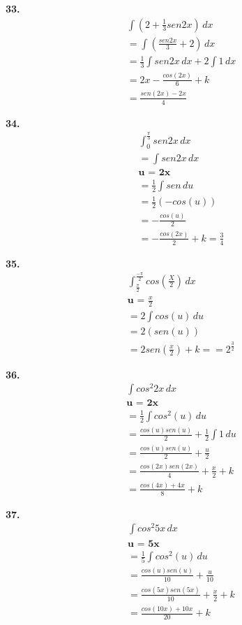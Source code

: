 \documentclass{article}
\begin{document}
\textbf{33.}
\begin{gather*}
    \int (2 + \frac{1}{3} sen2x)\,dx
\\
    = \int (\frac{sen2x}{3} + 2)\,dx
\\
    = \frac{1}{3} \int sen2x\,dx + 2 \int 1\,dx
\\
    = 2x - \frac{cos(2x)}{6} + k
\\
    = \frac{sen(2x)-2x}{4}
\end{gather*}

\textbf{34.}
\begin{gather*}
    \int_{0}^{\frac{\pi}{3}} sen 2x\,dx
\\
    = \int sen 2x\,dx
\\
    \textbf{u = 2x}
\\
    = \frac{1}{2} \int sen \,du
\\
    = \frac{1}{2}(-cos(u))
\\
    = - \frac{cos(u)}{2}
\\
    =  - \frac{cos(2x)}{2} + k = \frac{3}{4}
\end{gather*}

\textbf{35.}
\begin{gather*}
    \int_{\frac{\pi}{2}}^{\frac{-\pi}{2}} cos (\frac{X}{2})\,dx
\\
    \textbf{u = } \frac{x}{2}
\\
    = 2\int cos (u) \,du
\\
    = 2(sen(u))
\\
    = 2 sen(\frac{x}{2}) + k = =  2^{\frac{3}{2}}
\end{gather*}

\textbf{36.}
\begin{gather*}
    \int cos^2 2x\,dx
\\
    \textbf{u = 2x}
\\
    = \frac{1}{2} \int cos^2 (u) \,du
\\
    = \frac{cos(u)sen(u)}{2} + \frac{1}{2}\int 1\,du
\\
    = \frac{cos(u)sen(u)}{2} + \frac{u}{2}
\\
    = \frac{cos(2x)sen(2x)}{4} + \frac{x}{2} + k
\\
    = \frac{cos(4x) + 4x}{8} + k
\end{gather*}

\textbf{37.}
\begin{gather*}
    \int cos^2 5x\,dx
\\
    \textbf{u = 5x}
\\
    = \frac{1}{5} \int cos^2 (u) \,du
\\
    = \frac{cos(u)sen(u)}{10} + \frac{u}{10}
\\
    = \frac{cos(5x)sen(5x)}{10} + \frac{x}{2} + k
\\
    = \frac{cos(10x) + 10x}{20} + k
\end{gather*}
\end{document}
